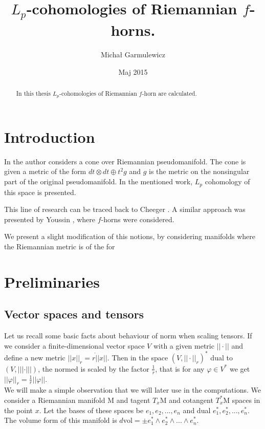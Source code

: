 \documentclass[licencjacka]{pracamgr}
\author{Michał Garmulewicz}
\title{$L_p$-cohomologies of Riemannian $f$-horns.}
\date{Maj 2015}
\theoremstyle{definition}
\theoremstyle{definition}
\theoremstyle{plain}
\theoremstyle{plain}
\begin{document}
\maketitle

\begin{abstract}
  In this thesis $L_p$-cohomologies of Riemannian $f$-horn are calculated.
\end{abstract}

\tableofcontents

\chapter{Introduction}

In \cite{weber} the author considers a cone over Riemannian
pseudomanifold.  The cone is given a metric of the form $dt \otimes dt
\oplus t^2 g$ and $g$ is the metric on the nonsingular part of the
original pseudomanifold. In the mentioned work, $L_p$ cohomology of
this space is presented.

This line of research can 
be traced back to Cheeger \cite{cheeger}. 
A similar approach was presented by Youssin \cite{youssin}, where $f$-horns
were considered.

 We present a slight modification of this notions, by considering
 manifolds where the Riemannian metric is of the for

\chapter{Preliminaries}
\section{Vector spaces and tensors}
Let us recall some basic facts about behaviour of norm when scaling tensors.
If we consider a finite-dimensional vector space $V$ with a given metric $||
\cdot ||$ and define a new metric $|| x ||_r  = r \dot || x ||$. Then in the
space $(V, || \cdot||_r)^\ast$ dual to $(V, ||| \cdot |||)$, the normed is scaled
by the factor $\frac{1}{r}$, that is for any $\varphi \in V^\ast$ we get
$||\varphi||_r = \frac{1}{r} ||\varphi|| $. \\

We will make a simple observation that we will later use in the
computations.  We consider a Riemannian manifold $\mathrm{M}$ and
tagent $T_x\mathrm{M}$ and cotangent $T_x^\ast\mathrm{M}$ spaces in
the point $x$.  Let the bases of these spaces be $e_1, e_2, ..., e_n$
and dual $e_1^\ast, e_2^\ast, ..., e_n^\ast$. The volume form of this
manifold is $d\mathrm{vol} = \pm e_1^\ast \wedge e_2^\ast \wedge
... \wedge e_n^\ast $. \\
\end{document}
